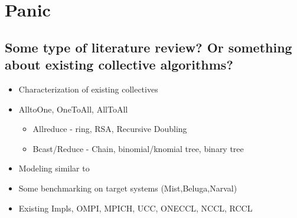 
\glsresetall %
\chapter[Panic]{Panic}\label{ch:Panic}

\section{Some type of literature review? Or something about existing collective algorithms?}

\begin{itemize}
	\item{Characterization of existing collectives}
	\item{AlltoOne, OneToAll, AllToAll}
    \begin{itemize}
        \item{Allreduce - ring, RSA, Recursive Doubling}
        \item{Bcast/Reduce - Chain, binomial/knomial tree, binary tree}
    \end{itemize}
    \item{Modeling similar to \cite{Thakur2005OptMPICH}}
    \item{Some benchmarking on target systems (Mist,Beluga,Narval)}
    \item{Existing Impls, OMPI, MPICH, UCC, ONECCL, NCCL, RCCL}
\end{itemize}

\clearpage
